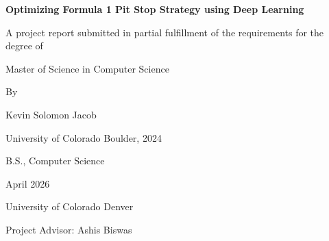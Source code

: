 \documentclass[12pt]{article}
\begin{document}
\begin{titlepage}
\centering
\vspace*{1cm}
{\LARGE\bfseries Optimizing Formula 1 Pit Stop Strategy using Deep Learning\par}
\vspace{1.5cm}
{\large A project report submitted in partial fulfillment of the requirements for the degree of\par}
{\large Master of Science in Computer Science\par}
\vspace{2cm}
{\large By\par}
\vspace{1cm}

{\large Kevin Solomon Jacob\par}
{\large University of Colorado Boulder, 2024\par}
{\large B.S., Computer Science\par}


\vspace{3cm}
{\large April 2026\par}
\vspace{0.1cm}
{\large University of Colorado Denver\par}
{\large Project Advisor: Ashis Biswas\par}


\end{titlepage}

\newpage


\newpage


\newpage
\tableofcontents
\newpage








\end{document}

